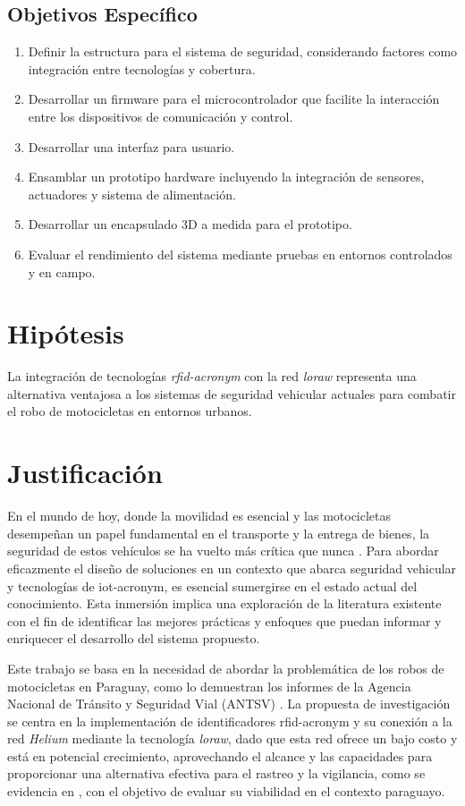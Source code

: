 \subsection{Objetivos Específico}
\begin{enumerate}
\item Definir la estructura para el sistema de seguridad, considerando factores como integración entre tecnologías y cobertura.
\item Desarrollar un firmware para el microcontrolador que facilite la interacción entre los dispositivos de comunicación y control. 
\item Desarrollar una interfaz para usuario.  
\item Ensamblar un prototipo hardware incluyendo la integración de sensores, actuadores y sistema de alimentación.
\item Desarrollar un encapsulado 3D a medida para el prototipo. 
\item Evaluar el rendimiento del sistema mediante pruebas en entornos controlados y en campo.
\end{enumerate}

\section{Hipótesis}
La integración de tecnologías \textit{\acrshort{rfid-acronym}} con la red \textit{\acrshort{loraw}} representa una alternativa ventajosa a los sistemas de seguridad vehicular actuales para combatir el robo de motocicletas en entornos urbanos.


\section{Justificación}
En el mundo de hoy, donde la movilidad es esencial y las motocicletas desempeñan un papel fundamental en el transporte y la entrega de bienes, la seguridad de estos vehículos se ha vuelto más crítica que nunca \cite{Rana, Sathiyanarayanan2018}. Para abordar eficazmente el diseño de soluciones en un contexto que abarca seguridad vehicular y tecnologías de \acrshort{iot-acronym}, es esencial sumergirse en el estado actual del conocimiento. Esta inmersión implica una exploración de la literatura existente con el fin de identificar las mejores prácticas y enfoques que puedan informar y enriquecer el desarrollo del sistema propuesto.

Este trabajo se basa en la necesidad de abordar la problemática de los robos de motocicletas en Paraguay, como lo demuestran los informes de la Agencia Nacional de Tránsito y Seguridad Vial (ANTSV) \cite{informeAnual2020, informeAnual2021}. La propuesta de investigación se centra en la implementación de identificadores \acrshort{rfid-acronym} y su conexión a la red \textit{Helium} mediante la tecnología \textit{\acrshort{loraw}}, dado que esta red ofrece un bajo costo y está en potencial crecimiento, aprovechando el alcance y las capacidades para proporcionar una alternativa efectiva para el rastreo y la vigilancia, como se evidencia en \cite{proyectoRFID}, con el objetivo de evaluar su viabilidad en el contexto paraguayo.

